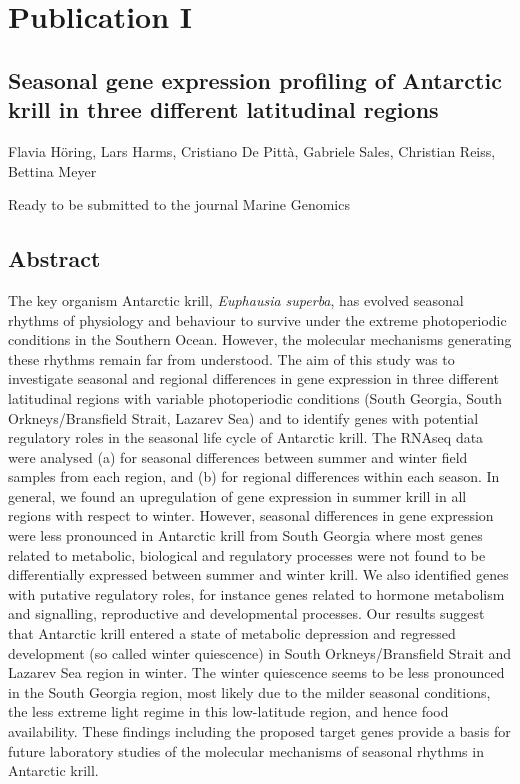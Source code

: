 \chapter[Publication I]{Publication I}

\section*{Seasonal gene expression profiling of Antarctic krill
in three different latitudinal regions}

Flavia Höring, Lars Harms, Cristiano De Pittà, Gabriele Sales, Christian Reiss,
Bettina Meyer
\begin{center}
Ready to be submitted to the journal Marine Genomics
\end{center}

\section{Abstract}

The key organism Antarctic krill, \textit{Euphausia superba}, has evolved
seasonal rhythms of physiology and behaviour to survive under the extreme
photoperiodic conditions in the Southern Ocean. However, the molecular
mechanisms generating these rhythms remain far from understood. The aim of this
study was to investigate seasonal and regional differences in gene expression
in three different latitudinal regions with variable photoperiodic conditions
(South Georgia, South Orkneys/Bransfield Strait, Lazarev Sea) and to identify
genes with potential regulatory roles in the seasonal life cycle of Antarctic
krill. The RNAseq data were analysed (a) for seasonal differences between
summer and winter field samples from each region, and (b) for regional
differences within each season. In general, we found an upregulation of gene
expression in summer krill in all regions with respect to winter.  However,
seasonal differences in gene expression were less pronounced in Antarctic krill
from South Georgia where most genes related to metabolic, biological and
regulatory processes were not found to be differentially expressed between
summer and winter krill. We also identified genes with putative regulatory
roles, for instance genes related to hormone metabolism and signalling,
reproductive and developmental processes. Our results suggest that Antarctic
krill entered a state of metabolic depression and regressed development (so
called winter quiescence) in South Orkneys/Bransfield Strait and Lazarev Sea
region in winter. The winter quiescence seems to be less pronounced in the
South Georgia region, most likely due to the milder seasonal conditions, the
less extreme light regime in this low-latitude region, and hence food
availability. These findings including the proposed target genes provide a
basis for future laboratory studies of the molecular mechanisms of seasonal
rhythms in Antarctic krill.

